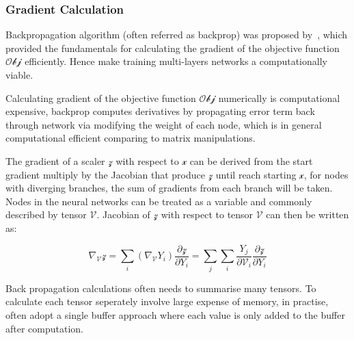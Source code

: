 \subsubsection{Gradient Calculation}
Backpropagation algorithm (often referred as backprop) was proposed by~\citet{werbos1975beyond}, which provided the fundamentals for calculating the gradient of the objective function $\mathcal{Obj}$ efficiently. Hence make training multi-layers networks a computationally viable. 
\par
Calculating gradient of the objective function $\mathcal{Obj}$ numerically is computational expensive, backprop computes derivatives by propagating error term back through network via modifying the weight of each node, which is in general computational efficient comparing to matrix manipulations. 
\par
The gradient of a scaler $\mathcal{z}$ with respect to $\mathcal{x}$ can be derived from the start gradient multiply by the Jacobian that produce $\mathcal{z}$ until reach starting $\mathcal{x}$, for nodes with diverging branches, the sum of gradients from each branch will be taken. Nodes in the neural networks can be treated as a variable and commonly described by tensor $\mathcal{V}$. Jacobian of $\mathcal{z}$ with respect to tensor $\mathcal{V}$ can then be written as:

\begin{equation}
    \nabla_{\mathcal{V}}\mathcal{z} = \sum_i (\nabla_{\mathcal{\mathcal{V}}} Y_i)\frac{\partial\mathcal{z}}{\partial Y_i} = \sum_j \sum_i \frac{Y_j}{\partial{\mathcal{V}}_i}\frac{\partial\mathcal{z}}{\partial Y_i}
\end{equation}

Back propagation calculations often needs to summarise many tensors. To calculate each tensor seperately involve large expense of memory, in practise, often adopt a single buffer approach where each value is only added to the buffer after computation.